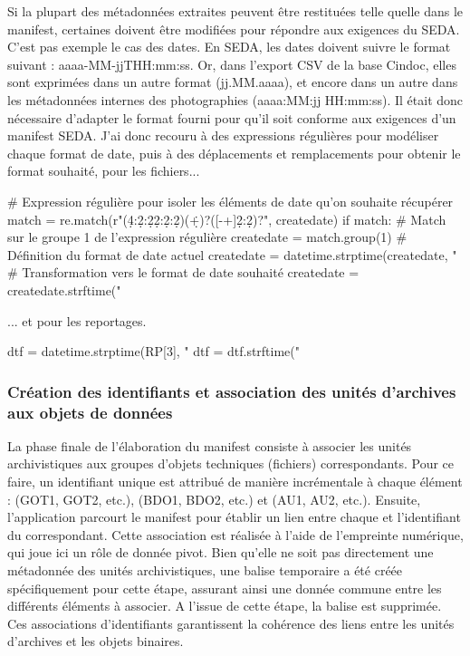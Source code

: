 Si la plupart des métadonnées extraites peuvent être restituées telle quelle dans le manifest, certaines doivent être modifiées pour répondre aux exigences du SEDA. C'est pas exemple le cas des dates. En SEDA, les dates doivent suivre le format suivant : aaaa-MM-jjTHH:mm:ss. Or, dans l'export CSV de la base Cindoc, elles sont exprimées dans un autre format (jj.MM.aaaa), et encore dans un autre dans les métadonnées internes des photographies (aaaa:MM:jj HH:mm:ss). Il était donc nécessaire d'adapter le format fourni pour qu'il soit conforme aux exigences d'un manifest SEDA. J'ai donc recouru à des expressions régulières pour modéliser chaque format de date, puis à des déplacements et remplacements pour obtenir le format souhaité, pour les fichiers...

\begin{python}
	# Expression régulière pour isoler les éléments de date qu'on souhaite récupérer
	match = re.match(r"(\d{4}:\d{2}:\d{2}\s\d{2}:\d{2}:\d{2})(\.\d+)?([-+]\d{2}:\d{2})?",
	createdate)
	if match:
	# Match sur le groupe 1 de l'expression régulière
	createdate = match.group(1)
	# Définition du format de date actuel
	createdate = datetime.strptime(createdate, "%
	# Transformation vers le format de date souhaité
	createdate = createdate.strftime("%
\end{python}

... et pour les reportages.

\begin{python}
	dtf = datetime.strptime(RP[3], "%
	dtf = dtf.strftime("%
\end{python}



\subsubsection*{Création des identifiants et association des unités d'archives aux objets de données}
La phase finale de l'élaboration du manifest consiste à associer les unités archivistiques aux groupes d'objets techniques (fichiers) correspondants. Pour ce faire, un identifiant unique est attribué de manière incrémentale à chaque élément :  (GOT1, GOT2, etc.),  (BDO1, BDO2, etc.) et  (AU1, AU2, etc.). Ensuite, l'application parcourt le manifest pour établir un lien entre chaque  et l'identifiant du  correspondant. Cette association est réalisée à l'aide de l'empreinte numérique, qui joue ici un rôle de donnée pivot. Bien qu'elle ne soit pas directement une métadonnée des unités archivistiques, une balise temporaire a été créée spécifiquement pour cette étape, assurant ainsi une donnée commune entre les différents éléments à associer. A l'issue de cette étape, la balise est supprimée. Ces associations d'identifiants garantissent la cohérence des liens entre les unités d'archives et les objets binaires.

